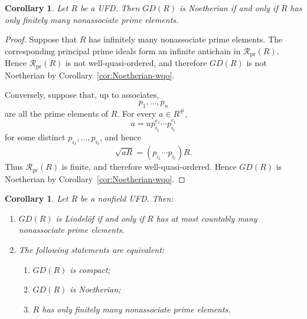 \documentclass[11pt]{amsart}
\theoremstyle{plain}
\newtheorem{corollary}[theorem]{Corollary}
\theoremstyle{definition}
\theoremstyle{remark}
\numberwithin{equation}{section}
\begin{document}
\begin{corollary}\label{cor:UFD-Noetherian}
	Let $R$ be a UFD. Then $GD(R)$ is Noetherian if and only if $R$ has
	only finitely many nonassociate prime elements.
\end{corollary}

\begin{proof}
	Suppose that $R$ has infinitely many nonassociate prime elements.
	The corresponding principal prime ideals form an infinite antichain
	in $\mathcal R_{\mathrm{pr}}(R)$. Hence
	$\mathcal R_{\mathrm{pr}}(R)$ is not well-quasi-ordered, and therefore
	$GD(R)$ is not Noetherian by
	Corollary~\ref{cor:Noetherian-wqo}.
	
	Conversely, suppose that, up to associates,
	\[
	p_1,\ldots,p_n
	\]
	are all the prime elements of $R$. For every $a\in R^\#$,
	\[
	a=u p_{i_1}^{e_1}\cdots p_{i_t}^{e_t}
	\]
	for some distinct $p_{i_1},\ldots,p_{i_t}$, and hence
	\[
	\sqrt{aR}
	=
	(p_{i_1}\cdots p_{i_t})R.
	\]
	Thus $\mathcal R_{\mathrm{pr}}(R)$ is finite, and therefore
	well-quasi-ordered. Hence $GD(R)$ is Noetherian by
	Corollary~\ref{cor:Noetherian-wqo}.
\end{proof}

\begin{corollary}\label{cor:UFD-finiteness}
	Let $R$ be a nonfield UFD. Then:
	\begin{enumerate}
		\item $GD(R)$ is Lindel\"of if and only if $R$ has at most
		countably many nonassociate prime elements.
		
		\item The following statements are equivalent:
		\begin{enumerate}
			\item $GD(R)$ is compact;
			\item $GD(R)$ is Noetherian;
			\item $R$ has only finitely many nonassociate prime elements.
		\end{enumerate}
	\end{enumerate}
\end{corollary}
\end{document}
